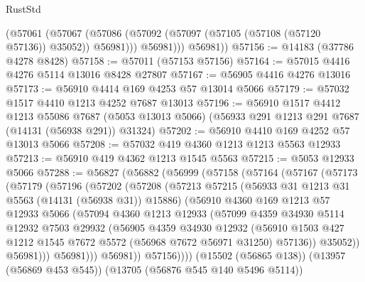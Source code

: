 \begin{lexlean}{RustStd}
\begin{coremodule}
            (@57061
              (@57067 (@57086 (@57092 (@57097 (@57105 (@57108 (@57120 @57136)) @35052)) @56981)))
              @56981)))
        @56981))
@57156 := @14183 (@37786 @4278 @8428)
@57158 := @57011 (@57153 @57156)
@57164 := @57015 @4416 @4276 @5114 @13016 @8428 @27807
@57167 := @56905 @4416 @4276 @13016
@57173 := @56910 @4414 @169 @4253 @57 @13014 @5066
@57179 := @57032 @1517 @4410 @1213 @4252 @7687 @13013
@57196 := @56910
    @1517
    @4412
    @1213
    @55086
    @7687
    (@5053 @13013 @5066)
    (@56933 @291 @1213 @291 @7687 (@14131 (@56938 @291)) @31324)
@57202 := @56910 @4410 @169 @4252 @57 @13013 @5066
@57208 := @57032 @419 @4360 @1213 @1213 @5563 @12933
@57213 := @56910 @419 @4362 @1213 @1545 @5563
@57215 := @5053 @12933 @5066
@57288 := @56827
    (@56882
      (@56999
        (@57158
          (@57164
            (@57167
              (@57173
                (@57179
                  (@57196
                    (@57202
                      (@57208
                        (@57213
                          @57215
                          (@56933 @31 @1213 @31 @5563 (@14131 (@56938 @31)) @15886)
                          (@56910
                            @4360
                            @169
                            @1213
                            @57
                            @12933
                            @5066
                            (@57094
                              @4360
                              @1213
                              @12933
                              (@57099
                                @4359
                                @34930
                                @5114
                                @12932
                                @7503
                                @29932
                                (@56905
                                  @4359
                                  @34930
                                  @12932
                                  (@56910
                                    @1503
                                    @427
                                    @1212
                                    @1545
                                    @7672
                                    @5572
                                    (@56968 @7672 @56971 @31250)
                                    @57136))
                                @35052))
                            @56981)))
                      @56981)))
                @56981))
            @57156))))
    (@15502 (@56865 @138))
    (@13957 (@56869 @453 @545))
    (@13705 (@56876 @545 @140 @5496 @5114))

\end{coremodule}
\end{lexlean}
